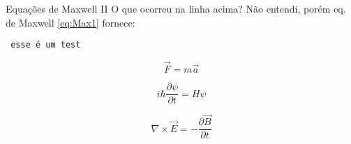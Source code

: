 \documentclass[style=sailor,clock,mode=present]{powerdot}
\begin{document}
\begin{slide}[toc=, method=direct]{Equações de Maxwell II}
O que ocorreu na linha acima? Não entendi, porém 
eq. de Maxwell \ref{eq:Max1} fornece:

\begin{verbatim}
 esse é um test 
\end{verbatim}

\begin{equation}\label{eq:2LN} 
 \vec{F} = m \vec{a}
\end{equation} 


\begin{equation}\label{eq:Sch} 
 i \hbar \frac{\partial \psi}{\partial t} = H \psi
\end{equation} 


\begin{equation}\label{eq:Max1} 
 \nabla \times \vec{E} = - \frac{\partial \vec{B}}{\partial t}
\end{equation} 

\end{slide}
\end{document}

